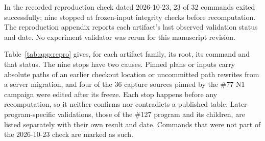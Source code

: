 \begin{revblock}
In the recorded reproduction check dated 2026-10-23, 23 of 32 commands exited successfully; nine stopped at frozen-input integrity checks before recomputation. The reproduction appendix reports each artifact's last observed validation status and date. No experiment validator was rerun for this manuscript revision.

Table~\ref{tab:app:repro} gives, for each artifact family, its root, its command and that status. The nine stops have two causes. Pinned plans or inputs carry absolute paths of an earlier checkout location or uncommitted path rewrites from a server migration, and four of the 36 capture sources pinned by the \#77 N1 campaign were edited after its freeze. Each stop happens before any recomputation, so it neither confirms nor contradicts a published table. Later program-specific validations, those of the \#127 program and its children, are listed separately with their own result and date. Commands that were not part of the 2026-10-23 check are marked as such.
\end{revblock}

